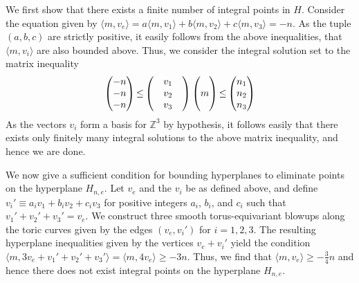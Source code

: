 \documentclass[aps,prl,twocolumn, superscriptaddress,groupedaddress,nofootinbib]{revtex4}
\begin{document}
We first show that there exists a finite number of integral points in $H$. Consider the equation given by $\langle m, v_{e} \rangle = a\langle m, v_{1} \rangle + b\langle m, v_{2} \rangle + c\langle m, v_{3} \rangle = -n$. As the tuple $(a,b,c)$ are strictly positive, it easily follows from the above inequalities, that $\langle m, v_{i} \rangle$ are also bounded above. Thus, we consider the integral solution set to the matrix inequality 
\begin{equation}
  \begin{pmatrix}
  -n \\ -n \\ -n
  \end{pmatrix}
  \begin{array}{@{}c@{}}
 {} \\ \leq \\ {}
  \end{array}
  \begin{pmatrix}
     {} & v_{1} & {} \\
    {} & v_{2} &{} \\
    {}  & v_{3} & {}
  \end{pmatrix}
  \begin{pmatrix}
    {} \\ m \\ {} 
  \end{pmatrix}
  \begin{array}{@{}c@{}}
    {} \\ \leq \\ {}
  \end{array}
  \begin{pmatrix}
    n_{1} \\ n_{2} \\ n_{3}
  \end{pmatrix}
\end{equation}
As the vectors $v_{i}$ form a basis for $\mathbb{Z}^{3}$ by hypothesis, it follows easily that there exists only finitely many integral solutions to the above matrix inequality, and hence we are done.

We now give a sufficient condition for bounding hyperplanes to eliminate points on the hyperplane $H_{n,e}$. Let $v_{e}$ and the $v_{i}$ be as defined above, and define $v_{i}' \equiv a_{i}v_{1} + b_{i}v_{2} + c_{i}v_{3}$ for positive integers $a_{i}$, $b_{i}$, and $c_{i}$ such that $v_{1}' + v_{2}' + v_{3}' = v_{e}$. We construct three smooth torus-equivariant blowups along the toric curves given by the edges $(v_{e},v_{i}')$ for $i = 1,2,3$. The resulting hyperplane inequalities given by the vertices $v_{e} + v_{i}'$ yield the condition $\langle m, 3v_{e} + v_{1}' + v_{2}' + v_{3}'\rangle = \langle m, 4v_{e} \rangle \geq -3n$. Thus, we find that $\langle m, v_{e} \rangle \geq -\frac{3}{4}n$ and hence there does not exist integral points on the hyperplane $H_{n,e}$.
\end{document}
